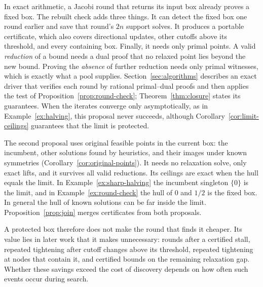 In exact arithmetic, a Jacobi round that returns its input box already
proves a fixed box. The rebuilt check adds three things. It can detect
the fixed box one round earlier and save that round's $2n$ support
solves. It produces a portable certificate, which also covers directional
updates, other cutoffs above its threshold, and every containing box.
Finally, it needs only primal points. A valid \emph{reduction} of a bound
needs a dual proof that no relaxed point lies beyond the new bound.
Proving the \emph{absence} of further reduction needs only primal
witnesses, which is exactly what a pool supplies.
Section~\ref{sec:algorithms} describes an exact driver that verifies each
round by rational primal--dual proofs and then applies the test of
Proposition~\ref{prop:round-check}; Theorem~\ref{thm:closure} states its
guarantees. When the iterates converge only asymptotically, as in
Example~\ref{ex:halving}, this proposal never succeeds, although
Corollary~\ref{cor:limit-ceilings} guarantees that the limit is
protected.

The second proposal uses original feasible points in the current box:
the incumbent, other solutions found by heuristics, and their images under
known symmetries (Corollary~\ref{cor:original-points}). It needs no relaxation solve, only
exact lifts, and it survives all valid reductions. Its ceilings are exact
when the hull equals the limit. In Example~\ref{ex:sharp-halving} the
incumbent singleton $\{0\}$ is the limit, and in
Example~\ref{ex:round-check} the hull of $0$ and $1/2$ is the fixed box.
In general the hull of known solutions can be far inside the limit.
Proposition~\ref{prop:join} merges certificates from both proposals.

A protected box therefore does not make the round that finds it cheaper.
Its value lies in later work that it makes unnecessary: rounds after a
certified stall, repeated tightening after cutoff changes above its
threshold, repeated tightening at nodes that contain it, and certified
bounds on the remaining relaxation gap. Whether these savings exceed the
cost of discovery depends on how often such events occur during search.
